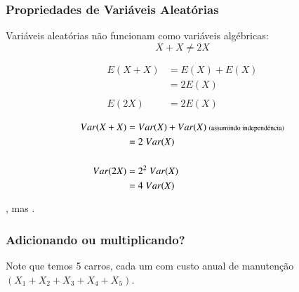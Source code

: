 \begin{frame}
\frametitle{Propriedades de Variáveis Aleatórias}
\justifying
Variáveis aleatórias não funcionam como variáveis algébricas:\\
\[ X + X \ne 2X \]

\pause

{\small
{}
{
\begin{align*}
E(X + X) &= E(X) + E(X) \\
&= 2 E(X) \\
&~  \\
E(2X) &= 2 E(X) \\
&~ 
\end{align*}
}
{
\begin{align*}
Var(X + X) &= Var(X) + Var(X)~{\scriptsize \text{(assumindo independência)}} \\
&= 2~Var(X) \\
&~  \\
Var(2X) &= 2^2~Var(X) \\
&= 4~Var(X)
\end{align*}
}
}


\pause

\vspace{3mm}

, mas .

\end{frame}


\begin{frame}
\frametitle{Adicionando ou multiplicando?}
\justifying
{}

\pause
\justifying
Note que temos 5 carros, cada um com custo anual de manutenção $(X_1 + X_2 + X_3 + X_4 + X_5)$.

\pause
\end{frame}


